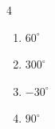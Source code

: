 \documentclass{ximera}
\begin{document}
\begin{multicols}{4}

\begin{enumerate}

\setcounter{enumi}{\value{HW}}

\item $60^{\circ}$
\item $300^{\circ}$
\item $-30^{\circ}$
\item $90^{\circ}$

\setcounter{HW}{\value{enumi}}

\end{enumerate}

\end{multicols}

\newpage
\end{document}
